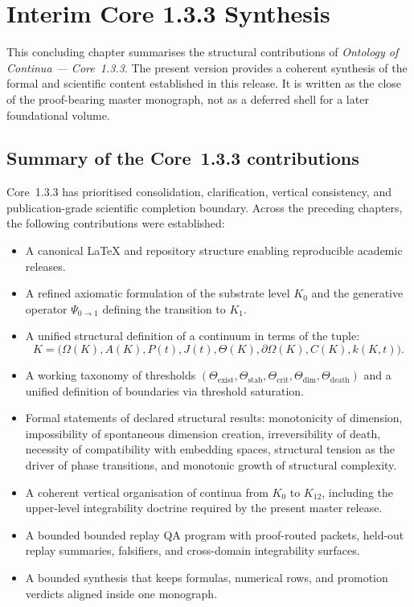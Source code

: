 
\section{Interim Core 1.3.3 Synthesis}
\label{sec:conclusion}

This concluding chapter summarises the structural contributions of
\emph{Ontology of Continua --- Core~1.3.3}. The present version provides a
coherent synthesis of the formal and scientific content established in this
release. It is written as the close of the proof-bearing master monograph,
not as a deferred shell for a later foundational volume.

\subsection{Summary of the Core~1.3.3 contributions}

Core~1.3.3 has prioritised consolidation, clarification, vertical consistency,
and publication-grade scientific completion boundary.
Across the preceding chapters, the following contributions were established:

\begin{itemize}
    \item A canonical \LaTeX{} and repository structure enabling reproducible academic releases.
    \item A refined axiomatic formulation of the substrate level \(K_0\) and the generative operator
          \(\Psi_{0\to 1}\) defining the transition to \(K_1\).
    \item A unified structural definition of a continuum in terms of the tuple:
          \[
              K = \big(\Omega(K), A(K), P(t), J(t), \Theta(K), \partial\Omega(K), C(K), k(K,t)\big).
          \]
    \item A working taxonomy of thresholds
          \((\Theta_{\mathrm{exist}}, \Theta_{\mathrm{stab}}, \Theta_{\mathrm{crit}},
            \Theta_{\mathrm{dim}}, \Theta_{\mathrm{death}})\)
          and a unified definition of boundaries via threshold saturation.
    \item Formal statements of declared structural results:
          monotonicity of dimension,
          impossibility of spontaneous dimension creation,
          irreversibility of death,
          necessity of compatibility with embedding spaces,
          structural tension as the driver of phase transitions,
          and monotonic growth of structural complexity.
    \item A coherent vertical organisation of continua from \(K_0\) to \(K_{12}\),
          including the upper-level integrability doctrine required by the present master release.
    \item A bounded bounded replay QA program with proof-routed packets, held-out replay summaries, falsifiers, and cross-domain integrability surfaces.
    \item A bounded synthesis that keeps formulas, numerical rows, and promotion verdicts aligned inside one monograph.
\end{itemize}

